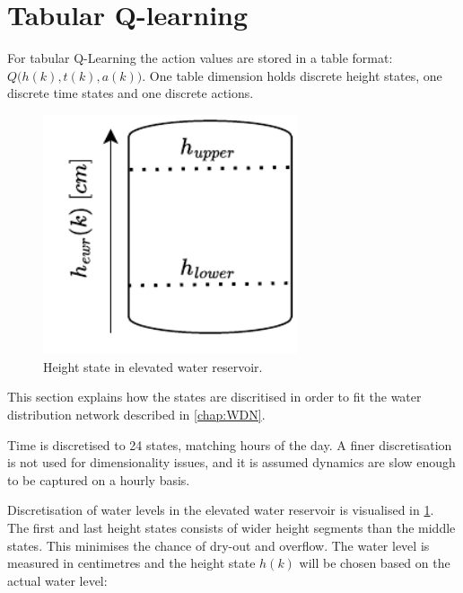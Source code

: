 \newpage \clearpage

\section{Tabular Q-learning}\label{sec:WDNTabularQ-Learning}

For tabular Q-Learning the action values are stored in a table format: $ Q\bigg(h(k),t(k),a(k)\bigg) $. One table dimension holds discrete height states, one discrete time states and one discrete actions. 

\begin{figure}
	\includegraphics[width=7.5cm]{figures/HeightStates - Copy.drawio.pdf}
	\caption{Height state in elevated water reservoir.}
	\label{fig:hState}
\end{figure} 

This section explains how the states are discritised in order to fit the water distribution network described in \cref{chap:WDN}. 

Time is discretised to 24 states, matching hours of the day. A finer discretisation is not used for dimensionality issues, and it is assumed dynamics are slow enough to be captured on a hourly basis.

Discretisation of water levels in the elevated water reservoir is visualised in \cref{fig:hState}. The first and last height states consists of wider height segments than the middle states. This minimises the chance of dry-out and overflow. The water level is measured in centimetres and the height state $ h(k) $ will be chosen based on the actual water level: 


